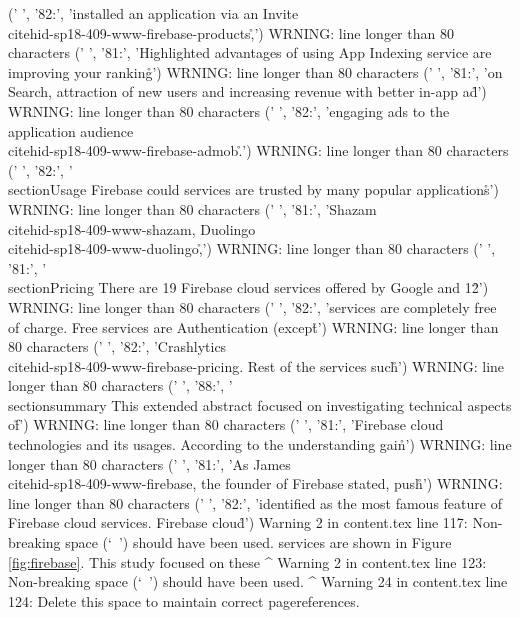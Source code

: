 ('      ', '82:', 'installed an application via an Invite~\\cite{hid-sp18-409-www-firebase-products,\r\n')
WRNING: line longer than 80 characters
('      ', '81:', 'Highlighted advantages of using App Indexing service are improving your ranking\r\n')
WRNING: line longer than 80 characters
('      ', '81:', 'on Search, attraction of new users and increasing revenue with better in-app ad\r\n')
WRNING: line longer than 80 characters
('      ', '82:', 'engaging ads to the application audience~\\cite{hid-sp18-409-www-firebase-admob}.\r\n')
WRNING: line longer than 80 characters
('      ', '82:', '\\section{Usage} Firebase could services are trusted by many popular applications\r\n')
WRNING: line longer than 80 characters
('      ', '81:', 'Shazam\\cite{hid-sp18-409-www-shazam}, Duolingo\\cite{hid-sp18-409-www-duolingo},\r\n')
WRNING: line longer than 80 characters
('      ', '81:', '\\section{Pricing} There are 19 Firebase cloud services offered by Google and 12\r\n')
WRNING: line longer than 80 characters
('      ', '82:', 'services are completely free of charge. Free services are Authentication (except\r\n')
WRNING: line longer than 80 characters
('      ', '82:', 'Crashlytics ~\\cite{hid-sp18-409-www-firebase-pricing}. Rest of the services such\r\n')
WRNING: line longer than 80 characters
('      ', '88:', '\\section{summary} This extended abstract focused on investigating technical aspects of\r\n')
WRNING: line longer than 80 characters
('      ', '81:', 'Firebase cloud technologies and its usages. According to the understanding gain\r\n')
WRNING: line longer than 80 characters
('      ', '81:', 'As James \\cite{hid-sp18-409-www-firebase}, the founder of Firebase stated, push\r\n')
WRNING: line longer than 80 characters
('      ', '82:', 'identified as the most famous feature of Firebase cloud services. Firebase cloud\r\n')
Warning 2 in content.tex line 117: Non-breaking space (`~') should have been used.
services are shown in Figure \ref{fig:firebase}. This study focused on these   
                            ^
Warning 2 in content.tex line 123: Non-breaking space (`~') should have been used.
                \cite{hid-sp18-409-www-firebase}}   
               ^
Warning 24 in content.tex line 124: Delete this space to maintain correct pagereferences.
